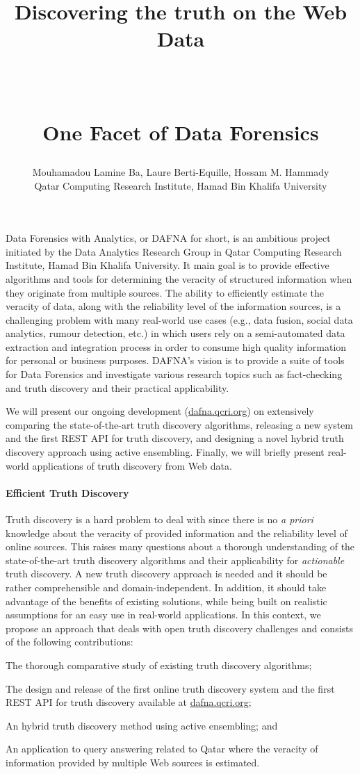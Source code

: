 \documentclass[paper=a4, fontsize=11pt]{scrartcl}	%
\title{ \vspace{-1in} 	\usefont{OT1}{bch}{b}{n}
		\huge \strut Discovering the truth on the Web Data\strut \\
		\Large \bfseries \strut One Facet of Data Forensics\strut
}
\author{ 									\usefont{OT1}{bch}{m}{n}
        Mouhamadou Lamine Ba, Laure Berti-Equille, Hossam M. Hammady\\		\usefont{OT1}{bch}{m}{n}
        Qatar Computing Research Institute, Hamad Bin Khalifa University\\	\usefont{OT1}{bch}{m}{n}
}
\date{}
\numberwithin{equation}{section}															%
\numberwithin{figure}{section}																%
\numberwithin{table}{section}																%
\begin{document}
\maketitle
 \vspace*{-1.4cm}
Data Forensics with Analytics, or DAFNA for short, is an ambitious project initiated by the Data Analytics Research Group in Qatar Computing Research
 Institute, Hamad Bin Khalifa University. It main goal is to provide effective algorithms and tools for determining the veracity of structured information when they originate from  multiple  sources. The ability to efficiently estimate the veracity of data, along with the reliability level of the information sources,
 is a challenging problem with many real-world use cases (e.g., data fusion, social data analytics, rumour detection, etc.) in which users rely on  a semi-automated data extraction  and integration process in order to consume high quality information for personal or business purposes. DAFNA's vision is to provide a suite of tools for Data Forensics and investigate various research topics such as fact-checking and truth discovery and their practical applicability.

We will present our ongoing development (\url{dafna.qcri.org}) on extensively comparing the state-of-the-art truth discovery algorithms, releasing a new system and 
the first REST API for truth discovery, and designing a novel hybrid truth discovery approach using active ensembling. Finally, we will briefly present real-world
applications of truth discovery from Web data.
 
\paragraph*{Efficient Truth Discovery}Truth discovery is a hard problem to deal with since there is no {\it a priori} knowledge about the veracity of provided information and the reliability level of online sources.
This raises many questions about a thorough understanding of the state-of-the-art truth discovery algorithms and their applicability for {\it actionable} truth discovery.  A new 
truth discovery approach is needed and it should be rather comprehensible and domain-independent. In addition, it should take  advantage of the benefits of existing solutions, while 
being built on realistic assumptions for an easy use in real-world applications.  In this context, we propose an approach that deals with open truth discovery challenges and consists 
of the following contributions:
 \begin{inparaenum}[(i)]
  \item The thorough comparative study of existing truth discovery algorithms;  
 \item The design and release of the first online truth discovery system and the first REST API for truth discovery available at \url{dafna.qcri.org};
 \item An hybrid truth discovery method using active ensembling; and
 \item An application to query answering related to Qatar where the veracity of information provided by multiple  Web sources is estimated.
 \end{inparaenum}

  \footnotesize
 
 
 \nocite{7113396}
 \nocite{DBLP:journals/corr/WaguihB14}
 \nocite{laurebook}
\end{document}
